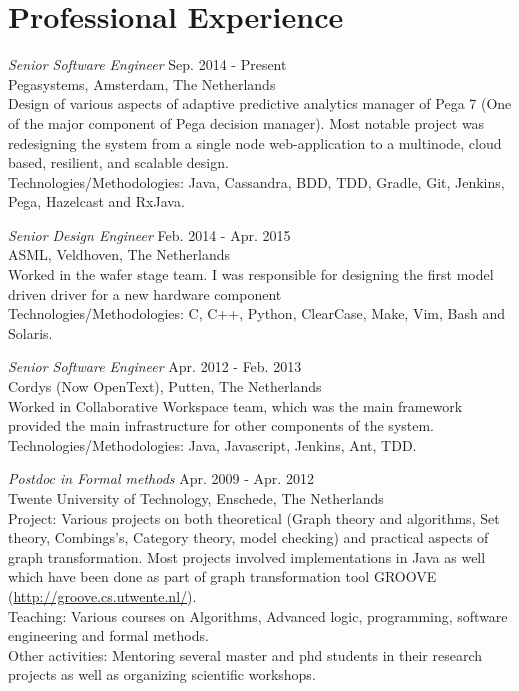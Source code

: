 \section{Professional Experience}

{\sl Senior Software Engineer} \hfill Sep. 2014 - Present \\
Pegasystems, Amsterdam, The Netherlands \\
Design of various aspects of adaptive predictive analytics manager of Pega 7 (One of the major component of Pega decision manager). Most notable project was redesigning the system from a single node web-application to a multinode, cloud based, resilient, and scalable design. \\
Technologies/Methodologies: Java, Cassandra, BDD, TDD, Gradle, Git, Jenkins, Pega, Hazelcast and RxJava.

{\sl Senior Design Engineer}  \hfill Feb. 2014 - Apr. 2015 \\
ASML, Veldhoven, The Netherlands \\
Worked in the wafer stage team. I was responsible for designing the first model driven driver for a new hardware component \\
Technologies/Methodologies: C, C++, Python, ClearCase, Make, Vim, Bash and Solaris.

{\sl Senior Software Engineer}  \hfill Apr. 2012 - Feb. 2013 \\
Cordys (Now OpenText), Putten, The Netherlands \\
Worked in Collaborative Workspace team, which was the main framework provided the main infrastructure for other components of the system. \\
Technologies/Methodologies: Java, Javascript, Jenkins, Ant, TDD.

{\sl Postdoc in Formal methods}  \hfill Apr. 2009 - Apr. 2012 \\
Twente University of Technology, Enschede, The Netherlands  \\
\ifindustry
Project: Various projects on both theoretical (Graph theory and algorithms, Set theory, Combings's, Category theory, model checking) and practical aspects of graph transformation. 
Most projects involved implementations in Java as well which have been done as part of graph transformation tool GROOVE (\url{http://groove.cs.utwente.nl/}).  \\
Teaching: Various courses on Algorithms, Advanced logic, programming, software engineering and formal methods. \\
Other activities: Mentoring several master and phd students in their research projects as well as organizing scientific workshops.
\fi

